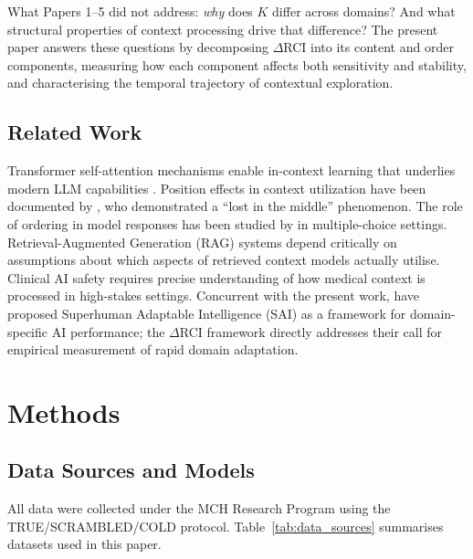 \documentclass[11pt,a4paper]{article}
\begin{document}
What Papers 1--5 did not address: \emph{why} does $K$ differ across domains? And what structural properties of context processing drive that difference? The present paper answers these questions by decomposing $\Delta$RCI into its content and order components, measuring how each component affects both sensitivity and stability, and characterising the temporal trajectory of contextual exploration.

\subsection{Related Work}

Transformer self-attention mechanisms \citep{vaswani2017attention} enable in-context learning that underlies modern LLM capabilities \citep{brown2020language}. Position effects in context utilization have been documented by \citet{liu2024lost}, who demonstrated a ``lost in the middle'' phenomenon. The role of ordering in model responses has been studied by \citet{pezeshkpour2024large} in multiple-choice settings. Retrieval-Augmented Generation (RAG) systems \citep{lewis2020retrieval} depend critically on assumptions about which aspects of retrieved context models actually utilise. Clinical AI safety \citep{wornow2023shaky, asgari2025framework} requires precise understanding of how medical context is processed in high-stakes settings. Concurrent with the present work, \citet{goldfeder2026ai} have proposed Superhuman Adaptable Intelligence (SAI) as a framework for domain-specific AI performance; the $\Delta$RCI framework directly addresses their call for empirical measurement of rapid domain adaptation.

\section{Methods}

\subsection{Data Sources and Models}

All data were collected under the MCH Research Program using the TRUE/SCRAMBLED/COLD protocol. Table~\ref{tab:data_sources} summarises datasets used in this paper.
\end{document}
